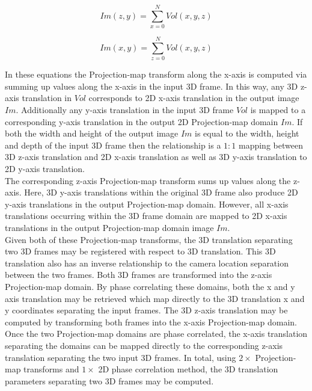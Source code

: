 \begin{equation} \label{eqn:xPMT}
Im(z,y) = \sum_{x=0}^{N}{Vol(x,y,z)}
\end{equation}

\begin{equation} \label{eqn:zPMT}
Im(x,y) = \sum_{z=0}^{N}{Vol(x,y,z)}
\end{equation}

In these equations the Projection-map transform along the x-axis is computed via summing up values along the x-axis in the input 3D frame. In this way, any 3D z-axis translation in $Vol$ corresponds to 2D x-axis translation in the output image $Im$. Additionally any y-axis translation in the input 3D frame $Vol$ is mapped to a corresponding y-axis translation in the output 2D Projection-map domain $Im$. If both the width and height of the output image $Im$ is equal to the width, height and depth of the input 3D frame then the relationship is a $1:1$ mapping between 3D z-axis translation and 2D x-axis translation as well as 3D y-axis translation to 2D y-axis translation. \\

The corresponding z-axis Projection-map transform sums up values along the z-axis. Here, 3D y-axis translations within the original 3D frame also produce 2D y-axis translations in the output Projection-map domain. However, all x-axis translations occurring within the 3D frame domain are mapped to 2D x-axis translations in the output Projection-map domain image $Im$. \\

Given both of these Projection-map transforms, the 3D translation separating two 3D frames may be registered with respect to 3D translation. This 3D translation also has an inverse relationship to the camera location separation between the two frames. Both 3D frames are transformed into the z-axis Projection-map domain. By phase correlating these domains, both the x and y axis translation may be retrieved which map directly to the 3D translation x and y coordinates separating the input frames. The 3D z-axis translation may be computed by transforming both frames into the x-axis Projection-map domain. Once the two Projection-map domains are phase correlated, the x-axis translation separating the domains can be mapped directly to the corresponding z-axis translation separating the two input 3D frames. In total, using $2 \times$ Projection-map transforms and $1 \times$ 2D phase correlation method, the 3D translation parameters separating two 3D frames may be computed. \\

